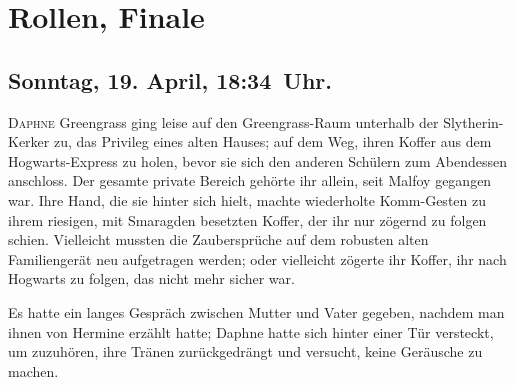 \chapter{Rollen, Finale}

\section{Sonntag, 19. April, 18:34~Uhr.}

\lettrine{D}{aphne} Greengrass ging leise auf den Greengrass-Raum unterhalb der Slytherin-Kerker zu, das Privileg eines alten Hauses; auf dem Weg, ihren Koffer aus dem Hogwarts-Express zu holen, bevor sie sich den anderen Schülern zum Abendessen anschloss. Der gesamte private Bereich gehörte ihr allein, seit Malfoy gegangen war. Ihre Hand, die sie hinter sich hielt, machte wiederholte Komm-Gesten zu ihrem riesigen, mit Smaragden besetzten Koffer, der ihr nur zögernd zu folgen schien. Vielleicht mussten die Zaubersprüche auf dem robusten alten Familiengerät neu aufgetragen werden; oder vielleicht zögerte ihr Koffer, ihr nach Hogwarts zu folgen, das nicht mehr sicher war.

Es hatte ein langes Gespräch zwischen Mutter und Vater gegeben, nachdem man ihnen von Hermine erzählt hatte; Daphne hatte sich hinter einer Tür versteckt, um zuzuhören, ihre Tränen zurückgedrängt und versucht, keine Geräusche zu machen.

